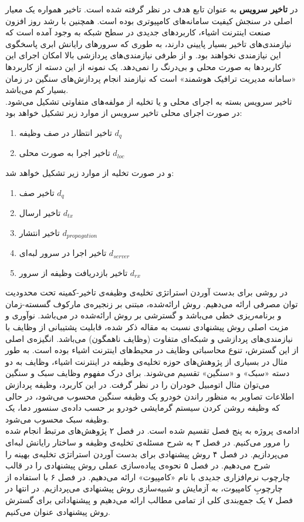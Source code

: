 در \CurrentProject \textbf{تاخیر سرویس} به عنوان تابع هدف در نظر گرفته شده است. تاخیر همواره یک معیار اصلی در سنجش کیفیت سامانه‌های کامپیوتری بوده است. همچنین با رشد روز افزون صنعت اینترنت اشیاء، کاربردهای جدیدی در سطح شبکه به وجود آمده است که نیازمندی‌های تاخیر بسیار پایینی دارند، به طوری که سرورهای رایانش ابری پاسخگوی این نیازمندی نخواهند بود. و از طرفی نیازمندی‌های پردازشی بالا امکان اجرای این کاربردها به صورت محلی و بی‌درنگ را نمی‌دهد. یک نمونه از این دسته از کاربردها «سامانه مدیریت ترافیک هوشمند» است که نیازمند انجام پردازش‌های سنگین در زمان بسیار کم می‌باشد. \\

تاخیر سرویس بسته به اجرای محلی و یا تخلیه از مولفه‌های متفاوتی تشکیل می‌شود. در صورت اجرای محلی تاخیر سرویس از موارد زیر تشکیل خواهد بود:
\begin{enumerate}
	\item تاخیر انتظار در صف وظیفه $d_q$
	\item تاخیر اجرا به صورت محلی $d_{l o c}$
\end{enumerate}
و در صورت تخلیه از موارد زیر تشکیل خواهد شد:
\begin{enumerate}
	\item تاخیر صف $d_q$
	\item تاخیر ارسال $d_{t x}$
	\item تاخیر انتشار $d_{p r o p a g a t i o n}$
	\item تاخیر اجرا در سرور لبه‌ای $d_{s e r v e r}$
	\item تاخیر بازدریافت وظیفه از سرور $d_{r x}$
\end{enumerate}
در \CurrentProject روشی برای بدست آوردن استراتژی تخلیه‌ی وظیفه‌ی تاخیر-کمینه تحت محدودیت توان مصرفی ارائه می‌دهیم. روش ارائه‌شده، مبتنی بر زنجیره‌ی مارکوف گسسته-زمان و برنامه‌ریزی خطی می‌باشد و گسترشی بر روش ارائه‌شده در \cite{Liu} می‌باشد. نوآوری و مزیت اصلی روش پیشنهادی نسبت به مقاله ذکر شده،‌ قابلیت پشتیبانی از وظایف با نیازمندی‌های پردازشی و شبکه‌ای متفاوت (وظایف ناهمگون) می‌باشد. انگیزه‌ی اصلی از این گسترش، تنوع محاسباتی وظایف در محیط‌های اینترنت اشیاء بوده است. به طور مثال در بسیاری از پژوهش‌های حوزه تخلیه‌ی وظیفه در اینترنت اشیاء، وظایف به دو دسته «سبک» و «سنگین» تقسیم می‌شوند. \cite{yousefpour} \cite{tran} برای درک مفهوم وظایف سبک و سنگین می‌توان مثال اتومبیل خودران را در نظر گرفت. در این کاربرد، وظیفه پردازش اطلاعات تصاویر به منظور راندن خودرو یک وظیفه سنگین محسوب می‌شود، در حالی که وظیفه‌ روشن کردن سیستم گرمایشی خودرو بر حسب داده‌ی سنسور دما، یک وظیفه سبک محسوب می‌شود. \\

ادامه‌ی پروژه به پنج فصل تقسیم شده است. در فصل ۲ پژوهش‌های مرتبط انجام شده را مرور می‌کنیم. در فصل ۳ به شرح مسئله‌ی تخلیه‌ی وظیفه و ساختار رایانش لبه‌ای می‌پردازیم. در فصل ۴ روش پیشنهادی برای بدست آوردن استراتژی تخلیه‌ی بهینه را شرح می‌دهیم. در فصل ۵ نحوه‌ی پیاده‌سازی عملی روش پیشنهادی را در قالب چارچوب نرم‌افزاری جدیدی با نام «کامپیوت» ارائه می‌دهیم. در فصل ۶ با استفاده از چارچوبِ کامپیوت، به آزمایش و شبیه‌سازی روش پیشنهادی می‌پردازیم. در انتها در فصل ۷ یک جمع‌بندی کلی از تمامی مطالب ارائه می‌دهیم و پیشنهاداتی برای گسترش روش پیشنهادی عنوان می‌کنیم.
\clearpage
